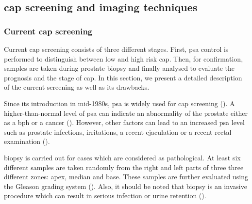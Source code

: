 \subsection{\ac{cap} screening and imaging techniques}

\subsubsection{Current \ac{cap} screening}\label{subsubsec:curscr}

Current \ac{cap} screening consists of three different stages. First, \ac{psa} control is performed to distinguish between low and high risk \ac{cap}. Then, for confirmation, samples are taken during prostate biopsy and finally analysed to evaluate the prognosis and the stage of \ac{cap}. In this section, we present a detailed description of the current screening as well as its drawbacks.

Since its introduction in mid-1980s, \ac{psa} is widely used for \ac{cap} screening (\cite{Etzioni2002}). A higher-than-normal level of \ac{psa} can indicate an abnormality of the prostate either as a \ac{bph} or a cancer (\cite{Hoeks2011}). However, other factors can lead to an increased \ac{psa} level such as prostate infections, irritations, a recent ejaculation or a recent rectal examination (\cite{Parfait2010}).%

 biopsy is carried out for cases which are considered as pathological. At least six different samples are taken randomly from the right and left parts of three three different zones: apex, median and base. These samples are further evaluated using the Gleason grading system (\cite{Gleason1977}). %
Also, it should be noted that biopsy is an invasive procedure which can result in serious infection or urine retention (\cite{Hara2005,Chou2011}).

